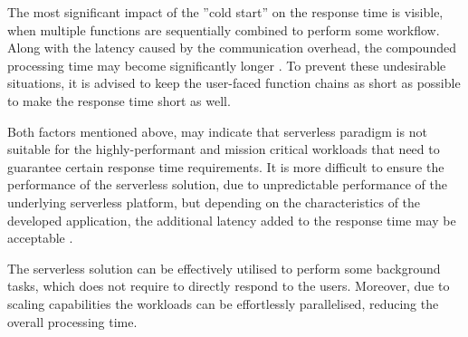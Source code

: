 The most significant impact of the ''cold start'' on the response time is visible, when multiple functions are sequentially combined to perform some workflow. Along with the latency caused by the communication overhead, the compounded processing time may become significantly longer \cite{EvaluationOfServerlessApplicationProgrammingModel}.
To prevent these undesirable situations, it is advised to keep the user-faced function chains as short as possible to make the response time short as well.

Both factors mentioned above, may indicate that serverless paradigm is not suitable for the highly-performant and mission critical workloads that need to guarantee certain response time requirements.
It is more difficult to ensure the performance of the serverless solution, due to unpredictable performance of the underlying serverless platform, but depending on the characteristics of the developed application, the additional latency added to the response time may be acceptable \cite{LeveragingServerlessCloudComputingArchitectures}.

The serverless solution can be effectively utilised to perform some background tasks, which does not require to directly respond to the users. Moreover, due to scaling capabilities the workloads can be effortlessly parallelised, reducing the overall processing time.





